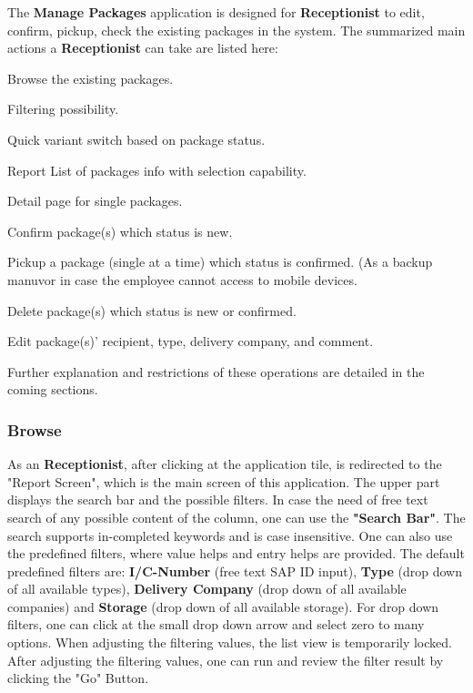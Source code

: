 The \textbf{Manage Packages} application is designed for \textbf{Receptionist} to edit, confirm, pickup, check the existing packages in the system. The summarized main actions a \textbf{Receptionist} can take are listed here:

\begin{compactenum}
	\item Browse the existing packages.
        \begin{compactenum}
            \item Filtering possibility.
            \item Quick variant switch based on package status.
            \item Report List of packages info with selection capability.
            \item Detail page for single packages.
        \end{compactenum}
    \item Confirm package(s) which status is new.
    \item Pickup a package (single at a time) which status is confirmed. (As a backup manuvor in case the employee cannot access to mobile devices.
    \item Delete package(s) which status is new or confirmed.
    \item Edit package(s)' recipient, type, delivery company, and comment.
\end{compactenum}
\bigskip

Further explanation and restrictions of these operations are detailed in the coming sections.


\subsubsection{Browse}
As an \textbf{Receptionist}, after clicking at the application tile, is redirected to the "Report Screen", which is the main screen of this application. 
The upper part displays the search bar and the possible filters. 
In case the need of free text search of any possible content of the column, one can use the \textbf{"Search Bar"}. The search supports in-completed keywords and is case insensitive. One can also use the predefined filters, where value helps and entry helps are provided.
The default predefined filters are: \textbf{I/C-Number} (free text SAP ID input), \textbf{Type} (drop down of all available types), \textbf{Delivery Company} (drop down of all available companies) and \textbf{Storage} (drop down of all available storage). 
For drop down filters, one can click at the small drop down arrow and select zero to many options. When adjusting the filtering values, the list view is temporarily locked. After adjusting the filtering values, one can run and review the filter result by clicking the "Go" Button.

